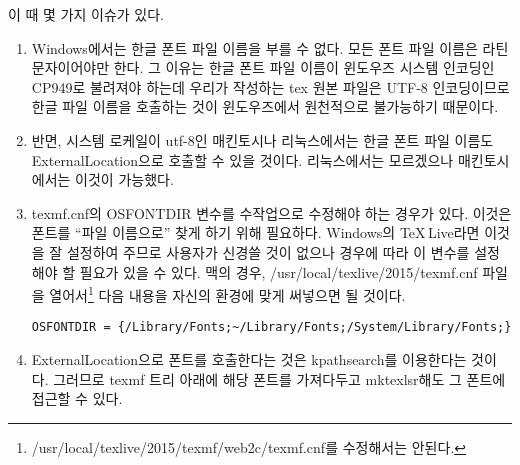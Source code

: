 \documentclass[
	12pt,
	a4paper,
	kosection,
	footnote,
	nobookmarks,
	microtype,
]{oblivoir}
\def\myLabel#1#2{\label{#1}}
\def\myLabel#1#2{\label{#2}}
\begin{document}
이 때 몇 가지 이슈가 있다.
\begin{enumerate}[(가)]\tightlist
\item Windows에서는 한글 폰트 파일 이름을 부를 수 없다. 모든 폰트 파일 이름은
라틴 문자이어야만 한다. 그 이유는 한글 폰트 파일 이름이 윈도우즈 시스템 인코딩인
CP949로 불려져야 하는데 우리가 작성하는 tex 원본 파일은 UTF-8 인코딩이므로
한글 파일 이름을 호출하는 것이 윈도우즈에서 원천적으로 불가능하기 때문이다.

\item 반면, 시스템 로케일이 utf-8인 매킨토시나 리눅스에서는 한글 폰트 파일 이름도
ExternalLocation으로 호출할 수 있을 것이다. 리눅스에서는 모르겠으나 매킨토시에서는
이것이 가능했다.

\item texmf.cnf의 OSFONTDIR 변수를 수작업으로 수정해야 하는 경우가 있다. 
이것은 폰트를 ``파일 이름으로'' 찾게 하기 위해 필요하다.
Windows의 \TeX\,Live라면 이것을 잘 설정하여 주므로 사용자가 신경쓸 것이 없으나
경우에 따라 이 변수를 설정해야 할 필요가 있을 수 있다. 맥의 경우,
/usr/local/texlive/2015/texmf.cnf 파일을 열어서\footnote{/usr/local/texlive/2015/texmf/web2c/texmf.cnf를
수정해서는 안된다.} 다음 내용을 자신의 환경에 맞게 써넣으면 될 것이다.
\begin{verbatim}
OSFONTDIR = {/Library/Fonts;~/Library/Fonts;/System/Library/Fonts;}
\end{verbatim}

\item ExternalLocation으로 폰트를 호출한다는 것은 kpathsearch를 이용한다는
것이다. 그러므로 texmf 트리 아래에 해당 폰트를 가져다두고 mktexlsr해도 그
폰트에 접근할 수 있다.

\end{enumerate}


\end{document}
